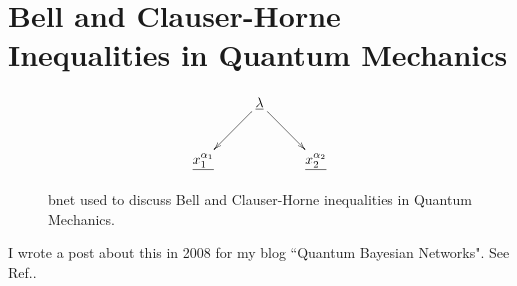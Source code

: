 \chapter{Bell  
and Clauser-Horne Inequalities 
in Quantum Mechanics}

\begin{figure}[h!]
\centering
$$\xymatrix{
&\ul{\lambda}\ar[dr]\ar[dl]&\\
\ul{x_1^{\alpha_1}}&&\ul{x_2^{\alpha_2}}
}$$
\caption{bnet used to discuss Bell 
and Clauser-Horne inequalities 
in Quantum Mechanics.}
\label{fig-monty}
\end{figure}

I wrote a post about
this in 2008 for
my blog ``Quantum Bayesian Networks". 
See Ref.\cite{bell-blog}.